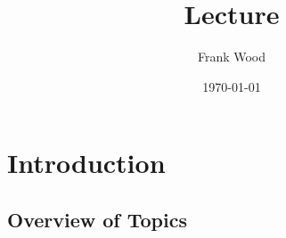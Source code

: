 \documentclass{beamer}
\title{Lecture}
\author{Frank Wood}
\date{\today}
\begin{document}
\frame{\titlepage}

\section[Outline]{}
\frame[t]{\tableofcontents}

\section{Introduction}
\subsection{Overview of Topics}

\section{}
\subsection{}

\frame[t] { 
 \frametitle{}
}
\end{document}
